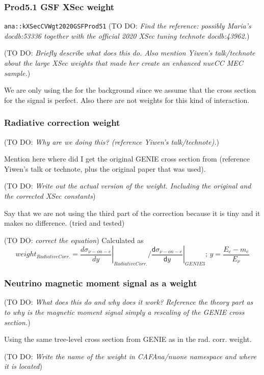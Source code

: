 \documentclass[12pt]{article}
\newcommand{\todo }[1]{({\color{red}\sc TO DO: \textit{#1}})}
\begin{document}
\subsubsection*{Prod5.1 GSF XSec weight}
\texttt{ana::kXSecCVWgt2020GSFProd51}
\todo{Find the reference: possibly Maria's docdb:53336 together with the official 2020 XSec tuning technote docdb:43962.}

\todo{Briefly describe what does this do. Also mention Yiwen's talk/technote about the large XSec weights that made her create an enhanced nueCC MEC sample.}

We are only using the for the background since we assume that the cross section for the signal is perfect. Also there are not weights for this kind of interaction.

\subsubsection*{Radiative correction weight}
\todo{Why are we doing this? (reference Yiwen's talk/technote).}

Mention here where did I get the original GENIE cross section from (reference Yiwen's talk or technote, plus the original paper that was used).

\todo{Write out the actual version of the weight. Including the original and the corrected XSec constants}

Say that we are not using the third part of the correction because it is tiny and it makes no difference. (tried and tested)

\todo{correct the equation}
Calculated as 
\begin{equation}
weight_{Radiative Corr.} = \left.\frac{d\sigma_{\nu-on-e}}{dy}\right|_{Radiative Corr.} / \left.\frac{\textsf{d}\sigma_{\nu-on-e}}{\textsf{d}y}\right|_{GENIE 3};\,y=\frac{E_e-m_e}{E_\nu}
\end{equation}

\subsubsection{Neutrino magnetic moment signal as a weight}
\todo{What does this do and why does it work? Reference the theory part as to why is the magnetic moment signal simply a rescaling of the GENIE cross section.}

Using the same tree-level cross section from GENIE as in the rad. corr. weight.

\todo{Write the name of the weight in CAFAna/nuone namespace and where it is located}
\end{document}
